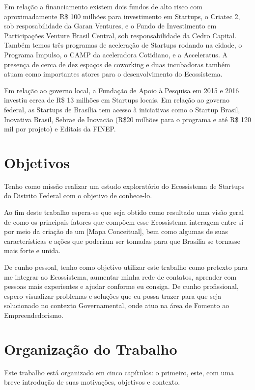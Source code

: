 Em relação a financiamento existem dois fundos de alto risco com aproximadamente R\$ 100 milhões para investimento em Startups, o Criatec 2, sob resposabilidade da Garan Ventures, e o Fundo de Investimento em Participações Venture Brasil Central, sob responsabilidade da Cedro Capital. Também temos três programas de aceleração de Startups rodando na cidade, o Programa Impulso, o CAMP da aceleradora Cotidiano, e a Acceleratus. A presença de cerca de dez espaços de coworking e duas incubadoras também atuam como importantes atores para o desenvolvimento do Ecossistema.

Em relação ao governo local, a Fundação de Apoio à Pesquisa em 2015 e 2016 investiu cerca de R\$ 13 milhões em Startups locais. Em relação ao governo federal, as Startups de Brasília tem acesso à iniciativas como o Startup Brasil, Inovativa Brasil, Sebrae de Inovacão (R\$20 milhões para o programa e até R\$ 120 mil por projeto) e Editais da FINEP.

\section{Objetivos}
\label{section:objetivos}

Tenho como missão realizar um estudo exploratório do Ecossistema de Startups do Distrito Federal com o objetivo de conhece-lo. 

Ao fim deste trabalho espera-se que seja obtido como resultado uma visão geral de como os principais fatores que compõem esse Ecossistema interagem entre si por meio da criação de um [Mapa Conceitual], bem como algumas de suas características e ações que poderiam ser tomadas para que Brasília se tornasse mais forte e unida.

De cunho pessoal, tenho como objetivo utilizar este trabalho como pretexto para me integrar ao Ecossistema, aumentar minha rede de contatos, aprender com pessoas mais experientes e ajudar conforme eu consiga. De cunho profissional, espero visualizar problemas e soluções que eu possa trazer para que seja solucionado no contexto Governamental, onde atuo na área de Fomento ao Empreendedorismo.

\section{Organização do Trabalho}
\label{section:organizacao_do_trabalho}

Este trabalho está organizado em cinco capítulos: o primeiro, este, com uma breve introdução de suas motivações, objetivos e contexto. 


